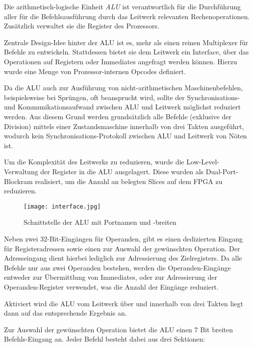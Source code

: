 \label{ch:alu}

Die arithmetisch-logische Einheit \textit{ALU} ist verantwortlich f\"ur die Durchf\"uhrung aller f\"ur die Befehlsausf\"uhrung durch das Leitwerk relevanten Rechenoperationen. Zus\"atzlich verwaltet sie die Register des Prozessors.


Zentrale Design-Idee hinter der ALU ist es, mehr als einen reinen Multiplexer f\"ur Befehle zu entwickeln. Stattdessen bietet sie dem Leitwerk ein Interface,
\"uber das Operationen auf Registern oder Immediates angefragt werden k\"onnen. Hierzu wurde eine Menge von Prozessor-internen Opcodes definiert.

Da die ALU auch zur Ausf\"uhrung von nicht-arithmetischen Maschinenbefehlen, beispielsweise bei Spr\"ungen, oft beansprucht wird, sollte der Synchronisations- und Kommunikationsaufwand zwischen ALU und Leitwerk m\"oglichst reduziert werden.
Aus diesem Grund werden grunds\"atzlich alle Befehle (exklusive der Division) mittels einer Zustandsmaschine innerhalb von drei Takten ausgef\"uhrt, wodurch kein Synchronisations-Protokoll zwischen ALU und Leitwerk von N\"oten ist.

Um die Komplexit\"at des Leitwerks zu reduzieren, wurde die Low-Level-Verwaltung der Register in die ALU ausgelagert. Diese wurden als Dual-Port-Blockram realisiert, um die Anzahl an belegten Slices auf dem FPGA zu reduzieren.

\begin{figure}[H]
	\centering
	\label{fig:aluinterface}
		\texttt{[image: interface.jpg]}
	\caption[Schnittstelle der ALU-Einheit]{Schnittstelle der ALU mit Portnamen und -breiten}
\end{figure}

Neben zwei 32-Bit-Eing\"angen f\"ur Operanden, gibt es einen dedizierten Eingang f\"ur Registeradressen sowie einen zur Auswahl der gew\"unschten Operation. 
Der Adresseingang dient hierbei lediglich zur Adressierung des Zielregisters. Da alle Befehle nur aus zwei Operanden bestehen, werden die Operanden-Eing\"ange entweder zur \"Ubermittlung von Immediates, oder zur Adressierung der Operanden-Register verwendet, was die Anzahl der Eing\"ange reduziert.

Aktiviert wird die ALU vom Leitwerk \"uber  und innerhalb von drei Takten liegt dann auf  das entsprechende Ergebnis an.

Zur Auswahl der gew\"unschten Operation bietet die ALU einen 7 Bit breiten Befehls-Eingang an.
Jeder Befehl besteht dabei aus drei Sektionen\vspace{10pt}:


